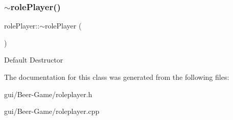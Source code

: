 \subsubsection{\texorpdfstring{$\sim$role\+Player()}{~rolePlayer()}}
{\footnotesize\ttfamily role\+Player\+::$\sim$role\+Player (\begin{DoxyParamCaption}{ }\end{DoxyParamCaption})}

Default Destructor 

The documentation for this class was generated from the following files\+:\begin{DoxyCompactItemize}
\item 
gui/\+Beer-\/\+Game/roleplayer.\+h\item 
gui/\+Beer-\/\+Game/roleplayer.\+cpp\end{DoxyCompactItemize}
